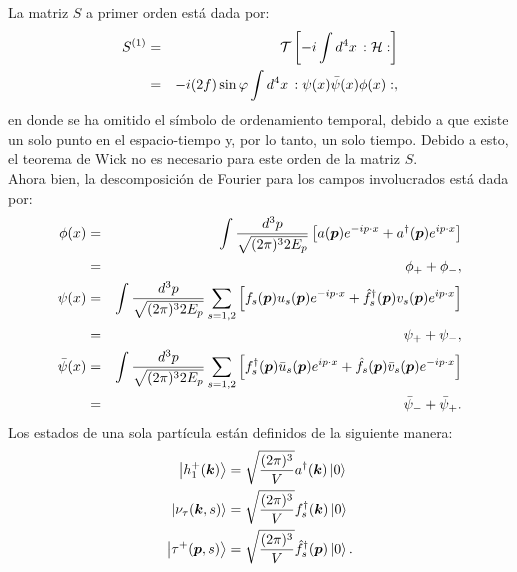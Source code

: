 La matriz $S$ a primer orden está dada por:
\begin{eqnarray}\label{s-matriz-1}
S^{(1)}&=&\mathcal{T}\left[-i\int d^4x\,:\mathcal{H}:\right] \nonumber \\
&=&-i(2f)\sin\varphi\int d^4x\,:\psi(x)\Bar{\psi}(x)\phi(x): ,
\end{eqnarray}
en donde se ha omitido el símbolo de ordenamiento temporal, debido a que existe un solo punto en el espacio-tiempo y, por lo
tanto, un solo tiempo. Debido a esto, el teorema de Wick no es necesario para este orden de la matriz $S$.\\
Ahora bien, la descomposición de Fourier para los campos involucrados está dada por:
\begin{eqnarray}\label{fourier-campos-1}
\phi(x)&=&\int\frac{d^3p}{\sqrt{(2\pi)^32E_p}}\left[a(\boldsymbol{p})e^{-ip\cdot x}+a^\dagger(\boldsymbol{p})e^{ip\cdot x}\right] \nonumber \\
&=&\phi_++\phi_-, \nonumber \\
\psi(x)&=&\int\frac{d^3p}{\sqrt{(2\pi)^32E_p}}\sum_{s=1,2}\left[f_s(\boldsymbol{p})u_s(\boldsymbol{p})e^{-ip\cdot
x}+\hat{f}_s^\dagger(\boldsymbol{p})v_s(\boldsymbol{p})e^{ip\cdot x}\right] \nonumber \\
&=&\psi_++\psi_-, \nonumber \\
\bar{\psi}(x)&=&\int\frac{d^3p}{\sqrt{(2\pi)^32E_p}}\sum_{s=1,2}\left[f_s^\dagger(\boldsymbol{p})\bar{u}_s(\boldsymbol{p})e^{ip\cdot
x}+\hat{f}_s(\boldsymbol{p})\bar{v}_s(\boldsymbol{p})e^{-ip\cdot x}\right] \nonumber \\
&=&\bar{\psi}_-+\bar{\psi}_+.
\end{eqnarray}
Los estados de una sola partícula están definidos de la siguiente manera:
\begin{equation}
  \label{estados-1-part-1}
\begin{split}
\left|h_1^+(\boldsymbol{k})\right\rangle&=\sqrt{\frac{(2\pi)^3}{V}}a^\dagger(\boldsymbol{k})\left|0\right\rangle \\
\left|\nu_\tau(\boldsymbol{k},s)\right\rangle&=\sqrt{\frac{(2\pi)^3}{V}}f_s^\dagger(\boldsymbol{k})\left|0\right\rangle \\
\left|\tau^+(\boldsymbol{p},s)\right\rangle&=\sqrt{\frac{(2\pi)^3}{V}}\Hat{f}_s^\dagger(\boldsymbol{p})\left|0\right\rangle. 
\end{split}
\end{equation}
